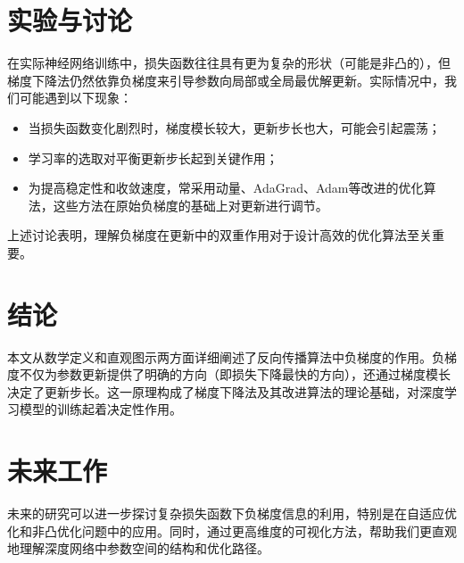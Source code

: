 \documentclass[11pt,twocolumn]{ctexart} %
\begin{document}
\section{实验与讨论}
在实际神经网络训练中，损失函数往往具有更为复杂的形状（可能是非凸的），但梯度下降法仍然依靠负梯度来引导参数向局部或全局最优解更新。实际情况中，我们可能遇到以下现象：
\begin{itemize}
    \item 当损失函数变化剧烈时，梯度模长较大，更新步长也大，可能会引起震荡；
    \item 学习率的选取对平衡更新步长起到关键作用；
    \item 为提高稳定性和收敛速度，常采用动量、AdaGrad、Adam等改进的优化算法，这些方法在原始负梯度的基础上对更新进行调节。
\end{itemize}
上述讨论表明，理解负梯度在更新中的双重作用对于设计高效的优化算法至关重要。

\section{结论}
本文从数学定义和直观图示两方面详细阐述了反向传播算法中负梯度的作用。负梯度不仅为参数更新提供了明确的方向（即损失下降最快的方向），还通过梯度模长决定了更新步长。这一原理构成了梯度下降法及其改进算法的理论基础，对深度学习模型的训练起着决定性作用。

\section{未来工作}
未来的研究可以进一步探讨复杂损失函数下负梯度信息的利用，特别是在自适应优化和非凸优化问题中的应用。同时，通过更高维度的可视化方法，帮助我们更直观地理解深度网络中参数空间的结构和优化路径。



\end{document}
